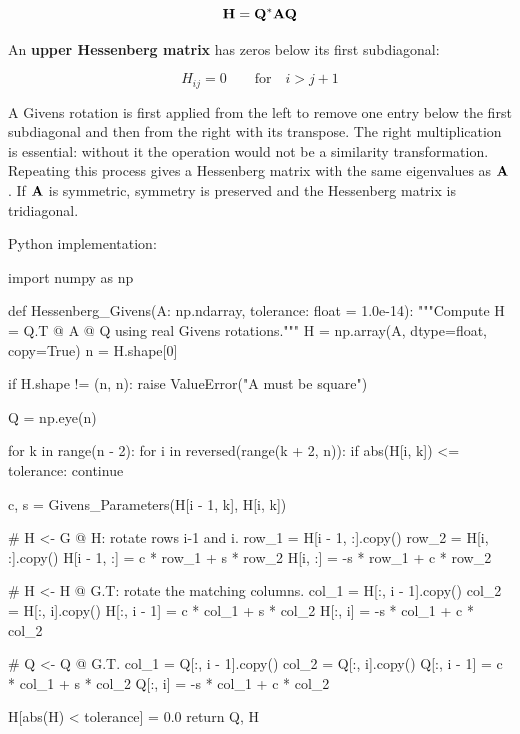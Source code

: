 \begin{equation}
    \mathbf{H}=\mathbf{Q}^{*}\mathbf{A}\mathbf{Q}
\end{equation}

An \textbf{upper Hessenberg matrix} has zeros below its first subdiagonal:

\begin{equation}
    H_{ij}=0 \qquad \text{for}\quad i>j+1
\end{equation}

A Givens rotation is first applied from the left to remove one entry below the
first subdiagonal and then from the right with its transpose. The right
multiplication is essential: without it the operation would not be a similarity
transformation. Repeating this process gives a Hessenberg matrix with the same
eigenvalues as $ \mathbf{A} $. If $ \mathbf{A} $ is symmetric, symmetry is preserved and
the Hessenberg matrix is tridiagonal.

Python implementation:

\begin{python}
import numpy as np


def Hessenberg_Givens(A: np.ndarray,
                      tolerance: float = 1.0e-14):
    """Compute H = Q.T @ A @ Q using real Givens rotations."""
    H = np.array(A, dtype=float, copy=True)
    n = H.shape[0]

    if H.shape != (n, n):
        raise ValueError("A must be square")

    Q = np.eye(n)

    for k in range(n - 2):
        for i in reversed(range(k + 2, n)):
            if abs(H[i, k]) <= tolerance:
                continue

            c, s = Givens_Parameters(H[i - 1, k], H[i, k])

            # H <- G @ H: rotate rows i-1 and i.
            row_1 = H[i - 1, :].copy()
            row_2 = H[i, :].copy()
            H[i - 1, :] = c * row_1 + s * row_2
            H[i, :] = -s * row_1 + c * row_2

            # H <- H @ G.T: rotate the matching columns.
            col_1 = H[:, i - 1].copy()
            col_2 = H[:, i].copy()
            H[:, i - 1] = c * col_1 + s * col_2
            H[:, i] = -s * col_1 + c * col_2

            # Q <- Q @ G.T.
            col_1 = Q[:, i - 1].copy()
            col_2 = Q[:, i].copy()
            Q[:, i - 1] = c * col_1 + s * col_2
            Q[:, i] = -s * col_1 + c * col_2

    H[abs(H) < tolerance] = 0.0
    return Q, H
\end{python}

